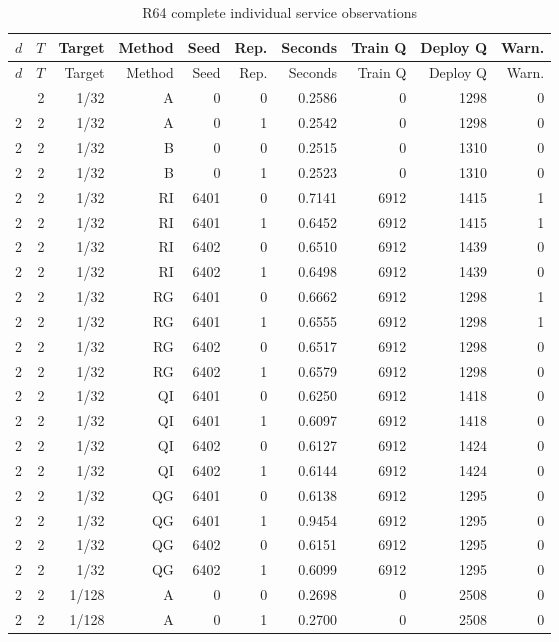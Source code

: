 \begingroup\small\setlength{\tabcolsep}{3pt}
\begin{longtable}{lrrrrrrrrr}
\caption{R64 complete individual service observations}\label{tab:all-R64-65}\\
\toprule
$d$ & $T$ & Target & Method & Seed & Rep. & Seconds & Train Q & Deploy Q & Warn. \\
\midrule
\endfirsthead
$d$ & $T$ & Target & Method & Seed & Rep. & Seconds & Train Q & Deploy Q & Warn. \\
\midrule
\endhead
\bottomrule
\endfoot
2 & 2 & 1/32 & A & 0 & 0 & 0.2586 & 0 & 1298 & 0 \\
2 & 2 & 1/32 & A & 0 & 1 & 0.2542 & 0 & 1298 & 0 \\
2 & 2 & 1/32 & B & 0 & 0 & 0.2515 & 0 & 1310 & 0 \\
2 & 2 & 1/32 & B & 0 & 1 & 0.2523 & 0 & 1310 & 0 \\
2 & 2 & 1/32 & RI & 6401 & 0 & 0.7141 & 6912 & 1415 & 1 \\
2 & 2 & 1/32 & RI & 6401 & 1 & 0.6452 & 6912 & 1415 & 1 \\
2 & 2 & 1/32 & RI & 6402 & 0 & 0.6510 & 6912 & 1439 & 0 \\
2 & 2 & 1/32 & RI & 6402 & 1 & 0.6498 & 6912 & 1439 & 0 \\
2 & 2 & 1/32 & RG & 6401 & 0 & 0.6662 & 6912 & 1298 & 1 \\
2 & 2 & 1/32 & RG & 6401 & 1 & 0.6555 & 6912 & 1298 & 1 \\
2 & 2 & 1/32 & RG & 6402 & 0 & 0.6517 & 6912 & 1298 & 0 \\
2 & 2 & 1/32 & RG & 6402 & 1 & 0.6579 & 6912 & 1298 & 0 \\
2 & 2 & 1/32 & QI & 6401 & 0 & 0.6250 & 6912 & 1418 & 0 \\
2 & 2 & 1/32 & QI & 6401 & 1 & 0.6097 & 6912 & 1418 & 0 \\
2 & 2 & 1/32 & QI & 6402 & 0 & 0.6127 & 6912 & 1424 & 0 \\
2 & 2 & 1/32 & QI & 6402 & 1 & 0.6144 & 6912 & 1424 & 0 \\
2 & 2 & 1/32 & QG & 6401 & 0 & 0.6138 & 6912 & 1295 & 0 \\
2 & 2 & 1/32 & QG & 6401 & 1 & 0.9454 & 6912 & 1295 & 0 \\
2 & 2 & 1/32 & QG & 6402 & 0 & 0.6151 & 6912 & 1295 & 0 \\
2 & 2 & 1/32 & QG & 6402 & 1 & 0.6099 & 6912 & 1295 & 0 \\
2 & 2 & 1/128 & A & 0 & 0 & 0.2698 & 0 & 2508 & 0 \\
2 & 2 & 1/128 & A & 0 & 1 & 0.2700 & 0 & 2508 & 0 \\

\end{longtable}
